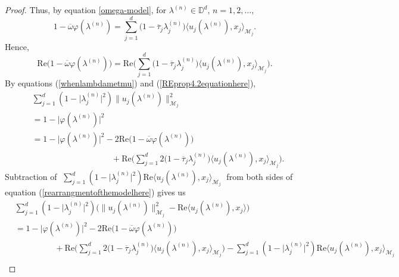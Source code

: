 \documentclass[11pt, reqno]{amsart}
\newcommand\1{\boldsymbol {1}}
\numberwithin{equation}{section}
\begin{document}
\begin{proof}
Thus,  by equation \eqref{omega-model},
   for $\lambda^{(n)}\in\mathbb{D}^{d}$, $n=1,2,\dots$,
\begin{equation}\label{prop4.2equationhere}
1-\overline{\omega}\varphi(\lambda^{(n)})=\sum_{j=1}^{d}\Big(1-\overline{\tau}_{j}\lambda^{(n)}_{j}\Big)\langle u_{j}(\lambda^{(n)}),x_{j}\rangle_{\mathcal{M}_{j}}.
\end{equation}
Hence,
\begin{equation}\label{REprop4.2equationhere}
\mathrm{Re}\bigg(1-\overline{\omega}\varphi(\lambda^{(n)})\bigg)=\mathrm{Re}\bigg(\sum_{j=1}^{d}\Big(1-\overline{\tau}_{j}\lambda^{(n)}_{j}\Big)\langle u_{j}(\lambda^{(n)}),x_{j}\rangle_{\mathcal{M}_{j}}\bigg).
\end{equation}
By equations (\ref{whenlambdametmu}) and (\ref{REprop4.2equationhere}),
\begin{align}
&\sum_{j=1}^{d}(1-\lvert \lambda_{j}^{(n)} \rvert^{2})\|u_{j}(\lambda^{(n)})\|_{\mathcal{M}_{j}}^{2}\nonumber\\
&= 1-\lvert \varphi(\lambda^{(n)}) \rvert^{2} \nonumber\\
&= 1-\lvert \varphi(\lambda^{(n)}) \rvert^{2}-2\mathrm{Re}\big(1-\overline{\omega}\varphi(\lambda^{(n)})\big)\nonumber\\
&\hspace{4cm}+ \mathrm{Re}\bigg(\sum_{j=1}^{d}2\Big(1-\overline{\tau}_{j}\lambda^{(n)}_{j}\Big)\langle u_{j}(\lambda^{(n)}),x_{j}\rangle_{\mathcal{M}_{j}}\bigg).
\label{rearrangmentofthemodelhere}
\end{align}
Subtraction of  $\; \sum_{j=1}^{d}(1-\lvert\lambda^{(n)}_{j}\rvert^{2})\mathrm{Re} \langle u_{j}(\lambda^{(n)}),x_{j}\rangle_{\mathcal{M}_{j}} \;$ from both sides of equation (\ref{rearrangmentofthemodelhere}) gives us 
\begin{align}
&\sum_{j=1}^{d}(1-\lvert \lambda^{(n)}_{j} \rvert^{2})\Big(\|u_{j}(\lambda^{(n)})\|_{\mathcal{M}_{j}}^{2}-\mathrm{Re}\langle u_{j}(\lambda^{(n)}),x_{j}\rangle  \Big)\nonumber\\
&=1-\lvert \varphi(\lambda^{(n)}) \rvert^{2}-2\mathrm{Re}\big(1-\overline{\omega}\varphi(\lambda^{(n)})\big)\nonumber\\
&\hspace{2cm}+ \mathrm{Re}\bigg(\sum_{j=1}^{d}2\Big(1-\overline{\tau}_{j}\lambda^{(n)}_{j}\Big)\langle u_{j}(\lambda^{(n)}),x_{j}\rangle_{\mathcal{M}_{j}}\bigg) - \sum_{j=1}^{d}(1-\lvert\lambda^{(n)}_{j}\rvert^{2})
\mathrm{Re} \langle u_{j}(\lambda^{(n)}),x_{j}\rangle_{\mathcal{M}_{j}} \nonumber \\

\end{align}
\end{proof}
\end{document}
